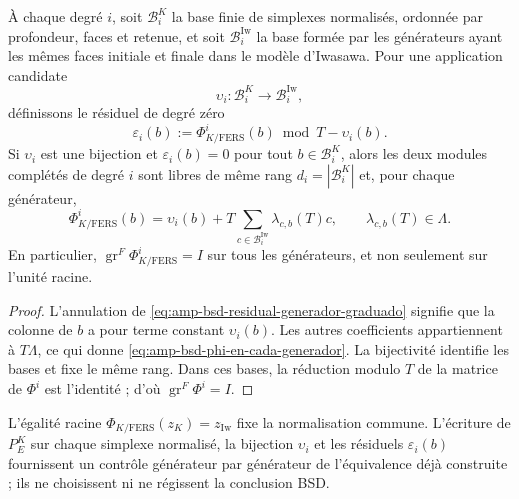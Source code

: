 \begin{lemma}
\label{lem:amp-bsd-bases-emparejadas-kato-fers}
À chaque degré \(i\), soit \(\mathcal B_i^K\) la base finie de simplexes
normalisés, ordonnée par profondeur, faces et retenue, et soit
\(\mathcal B_i^{\mathrm{Iw}}\) la base formée par les générateurs ayant les
mêmes faces initiale et finale dans le modèle d'Iwasawa. Pour une application
candidate
\[
 \upsilon_i:\mathcal B_i^K\longrightarrow
 \mathcal B_i^{\mathrm{Iw}},
\]
définissons le résiduel de degré zéro
\begin{equation}\label{eq:amp-bsd-residual-generador-graduado}
 \varepsilon_i(b)
 :=\Phi_{K/\mathrm{FERS}}^i(b)\bmod T-\upsilon_i(b).
\end{equation}
Si \(\upsilon_i\) est une bijection et
\(\varepsilon_i(b)=0\) pour tout \(b\in\mathcal B_i^K\), alors les deux
modules complétés de degré \(i\) sont libres de même rang
\(d_i=|\mathcal B_i^K|\) et, pour chaque générateur,
\begin{equation}\label{eq:amp-bsd-phi-en-cada-generador}
 \Phi_{K/\mathrm{FERS}}^i(b)
 =\upsilon_i(b)
  +T\sum_{c\in\mathcal B_i^{\mathrm{Iw}}}
    \lambda_{c,b}(T)c,
 \qquad \lambda_{c,b}(T)\in\Lambda.
\end{equation}
En particulier,
\(\operatorname{gr}^{F}\Phi_{K/\mathrm{FERS}}^i=I\) sur tous les
générateurs, et non seulement sur l'unité racine.
\end{lemma}

\begin{proof}
L'annulation de \eqref{eq:amp-bsd-residual-generador-graduado} signifie que la
colonne de \(b\) a pour terme constant \(\upsilon_i(b)\). Les autres
coefficients appartiennent à \(T\Lambda\), ce qui donne
\eqref{eq:amp-bsd-phi-en-cada-generador}. La bijectivité identifie les
bases et fixe le même rang. Dans ces bases, la réduction modulo \(T\) de la
matrice de \(\Phi^i\) est l'identité ; d'où
\(\operatorname{gr}^{F}\Phi^i=I\).
\end{proof}

L'égalité racine
\(\Phi_{K/\mathrm{FERS}}(z_K)=z_{\mathrm{Iw}}\) fixe la normalisation commune.
L'écriture de \(P_E^K\) sur chaque simplexe normalisé, la bijection
\(\upsilon_i\) et les résiduels \(\varepsilon_i(b)\) fournissent un
contrôle générateur par générateur de l'équivalence déjà construite ; ils ne choisissent ni ne
régissent la conclusion BSD.

